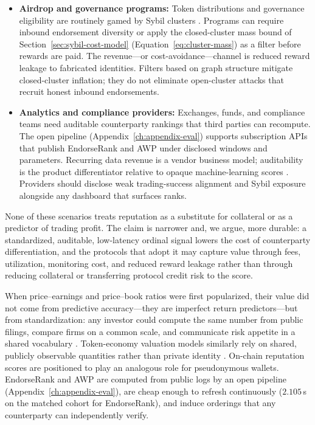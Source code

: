 \begin{itemize}
\item \textbf{Airdrop and governance programs:} Token distributions and governance eligibility are routinely gamed by Sybil clusters . Programs can require inbound endorsement diversity or apply the closed-cluster mass bound of Section~\ref{sec:sybil-cost-model} (Equation~\ref{eq:cluster-mass}) as a filter before rewards are paid. The revenue---or cost-avoidance---channel is reduced reward leakage to fabricated identities. Filters based on graph structure mitigate closed-cluster inflation; they do not eliminate open-cluster attacks that recruit honest inbound endorsements.

\item \textbf{Analytics and compliance providers:} Exchanges, funds, and compliance teams need auditable counterparty rankings that third parties can recompute. The open pipeline (Appendix~\ref{ch:appendix-eval}) supports subscription APIs that publish EndorseRank and AWP under disclosed windows and parameters. Recurring data revenue is a vendor business model; auditability is the product differentiator relative to opaque machine-learning scores . Providers should disclose weak trading-success alignment and Sybil exposure alongside any dashboard that surfaces ranks.
\end{itemize}

None of these scenarios treats reputation as a substitute for collateral or as a predictor of trading profit. The claim is narrower and, we argue, more durable: a standardized, auditable, low-latency ordinal signal lowers the cost of counterparty differentiation, and the protocols that adopt it may capture value through fees, utilization, monitoring cost, and reduced reward leakage rather than through reducing collateral or transferring protocol credit risk to the score.


When price--earnings and price--book ratios were first popularized, their value did not come from predictive accuracy---they are imperfect return predictors---but from standardization: any investor could compute the same number from public filings, compare firms on a common scale, and communicate risk appetite in a shared vocabulary . Token-economy valuation models similarly rely on shared, publicly observable quantities rather than private identity . On-chain reputation scores are positioned to play an analogous role for pseudonymous wallets. EndorseRank and AWP are computed from public logs by an open pipeline (Appendix~\ref{ch:appendix-eval}), are cheap enough to refresh continuously ($2.105$\,s on the matched cohort for EndorseRank), and induce orderings that any counterparty can independently verify.


